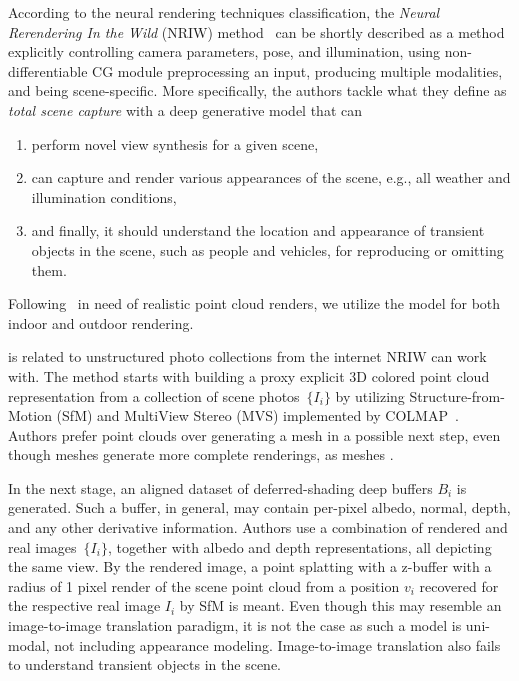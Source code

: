 According to the neural rendering techniques classification, the \emph{Neural Rerendering In the Wild} (NRIW) method~\citep{NRIW}
can be shortly described as a method explicitly controlling camera parameters, pose, and illumination, using
non-differentiable CG module preprocessing an input, producing multiple modalities, and being scene-specific.
More specifically, the authors tackle what they define as \emph{total scene capture} with a deep generative model that can
\begin{enumerate}
    \item perform novel view synthesis for a given scene,
    \item can capture and render various appearances of the scene, e.g., all
    weather and illumination conditions,
    \item and finally, it should understand the location and appearance of transient objects
    in the scene, such as people and vehicles, for reproducing or omitting them.
\end{enumerate}

Following~\citep{Bastien} in need of realistic point cloud renders, we utilize the model for
both indoor and outdoor rendering.

 is related to unstructured photo collections from the internet NRIW can work with.
The method starts with building a proxy explicit 3D colored point cloud representation from a collection of
scene photos~$\{I_i\}$ by utilizing Structure-from-Motion (SfM) and MultiView Stereo (MVS) implemented by
COLMAP~\citep{schoenberger2016sfm, schoenberger2016mvs}. Authors prefer point clouds over generating a mesh
in a possible next step, even though meshes generate more complete renderings, as meshes .

In the next stage, an aligned dataset of deferred-shading deep buffers $B_i$ is generated. Such a buffer,
in general, may contain per-pixel albedo, normal, depth, and any other derivative information. Authors use
a combination of rendered and real images~$\{I_i\}$, together with albedo and depth representations, all
depicting the same view. By the rendered image, a point splatting with a z-buffer with a radius of 1 pixel
render of the scene point cloud from a position $v_i$ recovered for the respective real image $I_i$ by SfM
is meant. Even though this may resemble an image-to-image translation paradigm, it is not the case as
such a model is uni-modal, not including appearance modeling. Image-to-image translation also fails to
understand transient objects in the scene.

